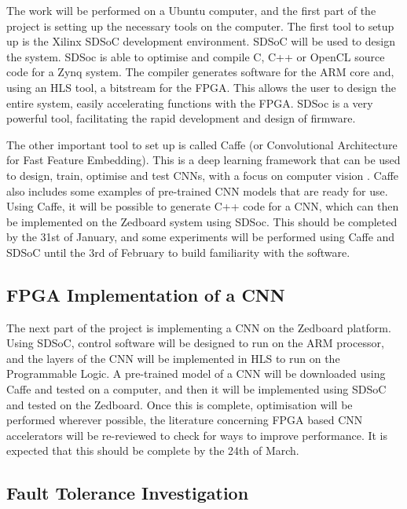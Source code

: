 \documentclass[12pt]{article}
\begin{document}
The work will be performed on a Ubuntu computer, and the first part of the project is setting up the necessary tools on the computer. The first tool to setup up is the Xilinx SDSoC development environment. SDSoC will be used to design the system. SDSoc is able to optimise and compile C, C++ or OpenCL source code for a Zynq system. The compiler generates software for the ARM core and, using an HLS tool, a bitstream for the FPGA. This allows the user to design the entire system, easily accelerating functions with the FPGA. SDSoc is a very powerful tool, facilitating the rapid development and design of firmware.

The other important tool to set up is called Caffe (or Convolutional Architecture for Fast Feature Embedding). This is a deep learning framework that can be used to design, train, optimise and test CNNs, with a focus on computer vision \cite{jia2014caffe}. Caffe also includes some examples of pre-trained CNN models that are ready for use. Using Caffe, it will be possible to generate C++ code for a CNN, which can then be implemented on the Zedboard system using SDSoc. This should be completed by the 31st of January, and some experiments will be performed using Caffe and SDSoC until the 3rd of February to build familiarity with the software.

\subsection{FPGA Implementation of a CNN}
\label{sec:ImpPlan-FPGAImplOfCnn}
\vspace{-12pt}

The next part of the project is implementing a CNN on the Zedboard platform. Using SDSoC, control software will be designed to run on the ARM processor, and the layers of the CNN will be implemented in HLS to run on the Programmable Logic. A pre-trained model of a CNN will be downloaded using Caffe and tested  on a computer, and then it will be implemented using SDSoC and tested on the Zedboard. Once this is complete, optimisation will be performed wherever possible, the literature concerning FPGA based CNN accelerators will be re-reviewed to check for ways to improve performance. It is expected that this should be complete by the 24th of March.

\subsection{Fault Tolerance Investigation}
\label{sec:ImpPlan-FaultTolInv}
\vspace{-12pt}
\end{document}
